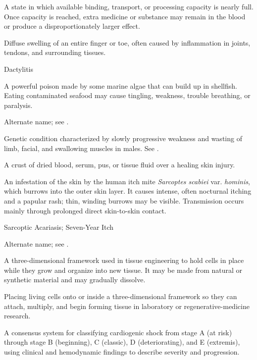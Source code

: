  A state in which available binding, transport, or processing capacity is nearly full. Once capacity is reached, extra medicine or substance may remain in the blood or produce a disproportionately larger effect.

 Diffuse swelling of an entire finger or toe, often caused by inflammation in joints, tendons, and surrounding tissues.

\synonyms
Dactylitis

 A powerful poison made by some marine algae that can build up in shellfish. Eating contaminated seafood may cause tingling, weakness, trouble breathing, or paralysis.

 Alternate name; see .

 Genetic condition characterized by slowly progressive weakness and wasting of limb, facial, and swallowing muscles in males. See .

 A crust of dried blood, serum, pus, or tissue fluid over a healing skin injury.

 An infestation of the skin by the human itch mite \textit{Sarcoptes scabiei} var. \textit{hominis}, which burrows into the outer skin layer. It causes intense, often nocturnal itching and a papular rash; thin, winding burrows may be visible. Transmission occurs mainly through prolonged direct skin-to-skin contact.

\synonyms
Sarcoptic Acariasis; Seven-Year Itch

 Alternate name; see .

 A three-dimensional framework used in tissue engineering to hold cells in place while they grow and organize into new tissue. It may be made from natural or synthetic material and may gradually dissolve.

 Placing living cells onto or inside a three-dimensional framework so they can attach, multiply, and begin forming tissue in laboratory or regenerative-medicine research.

 A consensus system for classifying cardiogenic shock from stage A (at risk) through stage B (beginning), C (classic), D (deteriorating), and E (extremis), using clinical and hemodynamic findings to describe severity and progression.

